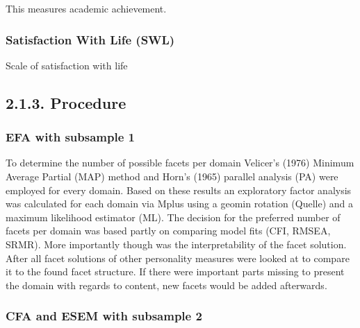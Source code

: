 \documentclass[,man,floatsintext]{apa6}
\theoremstyle{definition}
\theoremstyle{definition}
\theoremstyle{definition}
\theoremstyle{remark}
\begin{document}
This measures academic achievement.

\hypertarget{satisfaction-with-life-swl}{%
\subsubsection{Satisfaction With Life
(SWL)}\label{satisfaction-with-life-swl}}

Scale of satisfaction with life

\hypertarget{procedure}{%
\subsection{2.1.3. Procedure}\label{procedure}}

\hypertarget{efa-with-subsample-1}{%
\subsubsection{EFA with subsample 1}\label{efa-with-subsample-1}}

To determine the number of possible facets per domain Velicer's (1976)
Minimum Average Partial (MAP) method and Horn's (1965) parallel analysis
(PA) were employed for every domain. Based on these results an
exploratory factor analysis was calculated for each domain via Mplus
using a geomin rotation (Quelle) and a maximum likelihood estimator
(ML). The decision for the preferred number of facets per domain was
based partly on comparing model fits (CFI, RMSEA, SRMR). More
importantly though was the interpretability of the facet solution. After
all facet solutions of other personality measures were looked at to
compare it to the found facet structure. If there were important parts
missing to present the domain with regards to content, new facets would
be added afterwards.

\hypertarget{cfa-and-esem-with-subsample-2}{%
\subsubsection{CFA and ESEM with subsample
2}\label{cfa-and-esem-with-subsample-2}}
\end{document}
